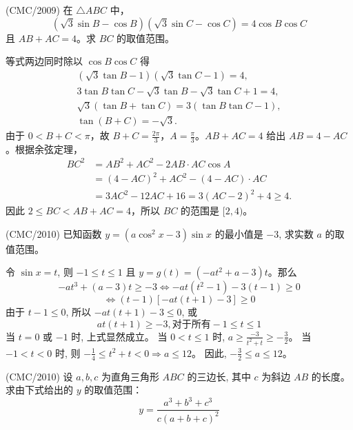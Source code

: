 \begin{questions}
\question (CMC/2009) 在 $\triangle ABC$ 中，
\[
(\sqrt{3} \sin B - \cos B)(\sqrt{3} \sin C - \cos C) = 4 \cos B \cos C
\]
且 $AB + AC = 4$。求 $BC$ 的取值范围。
\begin{solution}
等式两边同时除以 $\cos B \cos C$ 得
\begin{align*}
(\sqrt{3} \tan B - 1)(\sqrt{3} \tan C - 1) = 4, \\
3 \tan B \tan C - \sqrt{3} \tan B - \sqrt{3} \tan C + 1 = 4, \\
\sqrt{3}(\tan B + \tan C) = 3(\tan B \tan C - 1), \\
\tan(B + C) = -\sqrt{3}.
\end{align*}
由于 $0 < B + C < \pi$，故 $B + C = \frac{2\pi}{3}$，$A = \frac{\pi}{3}$。$AB + AC = 4$ 给出 $AB = 4 - AC$。根据余弦定理，
\begin{align*}
BC^2 &= AB^2 + AC^2 - 2AB \cdot AC \cos A \\
&= (4 - AC)^2 + AC^2 - (4 - AC) \cdot AC \\
&= 3AC^2 - 12AC + 16 = 3(AC - 2)^2 + 4 \ge 4.
\end{align*}
因此 $2 \le BC < AB + AC = 4$，所以 $BC$ 的范围是 $[2, 4)$。
\end{solution}

\question (CMC/2010) 已知函数 $y = \left( a \cos^2 x - 3 \right) \sin x$ 的最小值是 $-3$, 求实数 $a$ 的取值范围。

\begin{solution}
令 $\sin x = t$, 则 $-1 \le t \le 1$ 且 $y = g(t) = \left( -a t^2 + a - 3 \right) t$。那么
\[
-a t^3 + (a - 3) t \ge -3 \iff -a t \left( t^2 - 1 \right) - 3(t - 1) \ge 0
\]
\[
\iff (t - 1) \left[ -a t (t + 1) - 3 \right] \ge 0
\]
由于 $t - 1 \le 0$, 所以 $-a t (t + 1) - 3 \le 0$, 或
\[
a t (t + 1) \ge -3, \text{对于所有} -1 \le t \le 1
\]
当 $t = 0$ 或 $-1$ 时, 上式显然成立。
当 $0 < t \le 1$ 时, $a \ge \frac{-3}{t^2 + t} \ge -\frac{3}{2}$。
当 $-1 < t < 0$ 时, 则 $-\frac{1}{4} \le t^2 + t < 0 \Rightarrow a \le 12$。
因此, $-\frac{3}{2} \le a \le 12$。
\end{solution}

\question (CMC/2010) 设 $a, b, c$ 为直角三角形 $ABC$ 的三边长, 其中 $c$ 为斜边 $AB$ 的长度。求由下式给出的 $y$ 的取值范围：
\[
y = \frac{a^3 + b^3 + c^3}{c(a + b + c)^2}
\]


\end{questions}
